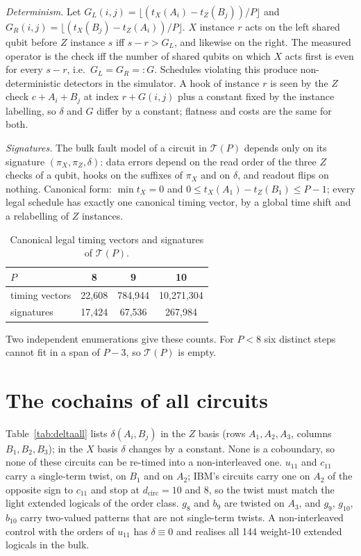 \documentclass[aps,prl,twocolumn,superscriptaddress,nofootinbib]{revtex4-2}
\newcommand{\dcirc}{d_{\mathrm{circ}}}
\newcommand{\T}{\mathcal{T}}
\begin{document}
\emph{Determinism.} Let $G_L(i,j)=\lfloor(t_X(A_i)-t_Z(B_j))/P\rfloor$ and
$G_R(i,j)=\lfloor(t_X(B_j)-t_Z(A_i))/P\rfloor$. $X$ instance $r$ acts on the left shared
qubit before $Z$ instance $s$ iff $s-r>G_L$, and likewise on the right. The measured operator
is the check iff the number of shared qubits on which $X$ acts first is even for every
$s-r$, i.e.\ $G_L=G_R=:G$. Schedules violating this produce non-deterministic detectors in
the simulator. A hook of instance $r$ is seen by the $Z$ check $c+A_i+B_j$ at index
$r+G(i,j)$ plus a constant fixed by the instance labelling, so $\delta$ and $G$ differ by a
constant; flatness and costs are the same for both.

\emph{Signatures.} The bulk fault model of a circuit in $\T(P)$ depends only on its
signature $(\pi_X,\pi_Z,\delta)$: data errors depend on the read order of the three $Z$
checks of a qubit, hooks on the suffixes of $\pi_X$ and on $\delta$, and readout flips on
nothing. Canonical form: $\min t_X=0$ and $0\le t_X(A_1)-t_Z(B_1)\le P-1$; every legal
schedule has exactly one canonical timing vector, by a global time shift and a relabelling
of $Z$ instances.

\begin{table}[h]
\caption{Canonical legal timing vectors and signatures of $\T(P)$.}
\label{tab:counts}
\begin{ruledtabular}
\begin{tabular}{lccc}
$P$ & 8 & 9 & 10\\
\hline
timing vectors & 22,608 & 784,944 & 10,271,304\\
signatures & 17,424 & 67,536 & 267,984\\
\end{tabular}
\end{ruledtabular}
\end{table}

Two independent enumerations give these counts. For $P<8$ six distinct steps cannot fit
in a span of $P-3$, so $\T(P)$ is empty.

\section{The cochains of all circuits}\label{sm:delta}
Table~\ref{tab:deltaall} lists $\delta(A_i,B_j)$ in the $Z$ basis (rows $A_1,A_2,A_3$,
columns $B_1,B_2,B_3$); in the $X$ basis $\delta$ changes by a constant. None is a
coboundary, so none of these circuits can be re-timed into a non-interleaved one. $u_{11}$
and $c_{11}$ carry a single-term twist, on $B_1$ and on $A_2$; IBM's circuits carry one on
$A_2$ of the opposite sign to $c_{11}$ and stop at $\dcirc=10$ and 8, so the twist must
match the light extended logicals of the order class. $g_8$ and $b_9$ are twisted on
$A_3$, and $g_9$, $g_{10}$, $b_{10}$ carry two-valued patterns that are not single-term
twists. A non-interleaved control with the orders of $u_{11}$ has $\delta\equiv0$ and
realises all 144 weight-10 extended logicals in the bulk.
\end{document}
